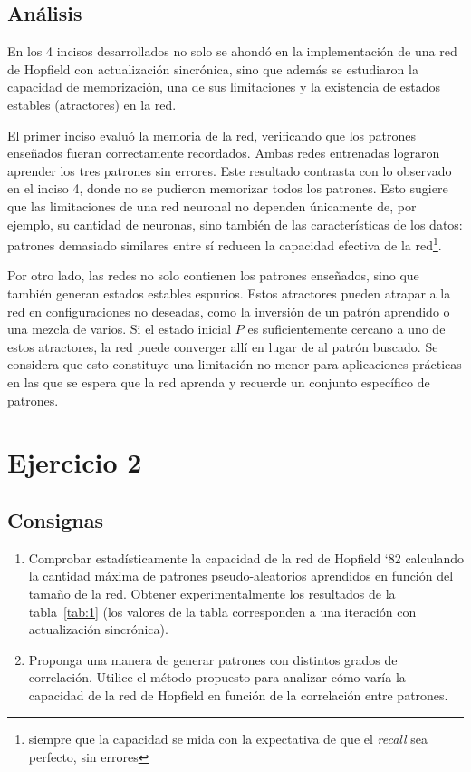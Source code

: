 \documentclass[11pt]{article} %
\begin{document}
\clearpage
\newpage

\subsection{Análisis}

En los 4 incisos desarrollados no solo se ahondó en la implementación de una red de Hopfield con actualización sincrónica, sino que además se estudiaron la capacidad de memorización, una de sus limitaciones y la existencia de estados estables (atractores) en la red. 

El primer inciso evaluó la memoria de la red, verificando que los patrones enseñados fueran correctamente recordados. Ambas redes entrenadas lograron aprender los tres patrones  sin errores. Este resultado contrasta con lo observado en el inciso 4, donde no se pudieron memorizar todos los patrones. Esto sugiere que las limitaciones de una red neuronal no dependen únicamente de, por ejemplo, su cantidad de neuronas, sino también de las características de los datos: patrones demasiado similares entre sí reducen la capacidad efectiva de la red\footnote{siempre que la capacidad se mida con la expectativa de que el \textit{recall} sea perfecto, sin errores}.

Por otro lado, las redes no solo contienen los patrones enseñados, sino que también generan estados estables espurios. Estos atractores pueden atrapar a la red en configuraciones no deseadas, como la inversión de un patrón aprendido o una mezcla de varios.   Si el estado inicial $P$ es suficientemente cercano a uno de estos atractores, la red puede converger allí en lugar de al patrón buscado. Se considera que esto constituye una limitación no menor para aplicaciones prácticas en las que se espera que la red aprenda y recuerde un conjunto específico de patrones. 

\clearpage
\newpage

\section{Ejercicio 2}

\subsection{Consignas}
\begin{enumerate}[label=\alph*]
\item Comprobar estadísticamente la capacidad de la red de Hopfield ‘82 calculando la
cantidad máxima de patrones pseudo-aleatorios aprendidos en función del tamaño
de la red. Obtener experimentalmente los resultados de la tabla~\ref{tab:1} (los
valores de la tabla corresponden a una iteración con actualización sincrónica).
\item Proponga una manera de generar patrones con distintos grados de correlación.
Utilice el método propuesto para analizar cómo varía la capacidad de la red de
Hopfield en función de la correlación entre patrones.
\end{enumerate}
\end{document}
